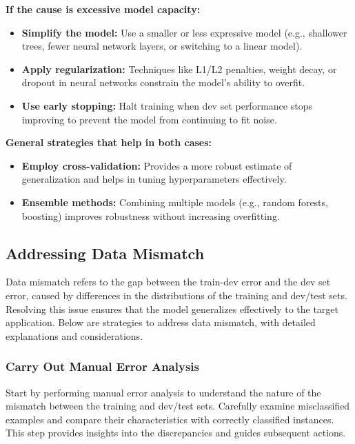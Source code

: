 \documentclass[12pt,openany, draft]{book}
\begin{document}
\textbf{If the cause is excessive model capacity:}
\begin{itemize}
    \item \textbf{Simplify the model:} Use a smaller or less expressive model (e.g., shallower trees, fewer neural network layers, or switching to a linear model).
    \item \textbf{Apply regularization:} Techniques like L1/L2 penalties, weight decay, or dropout in neural networks constrain the model's ability to overfit.
    \item \textbf{Use early stopping:} Halt training when dev set performance stops improving to prevent the model from continuing to fit noise.
\end{itemize}

\textbf{General strategies that help in both cases:}
\begin{itemize}
    \item \textbf{Employ cross-validation:} Provides a more robust estimate of generalization and helps in tuning hyperparameters effectively.
    \item \textbf{Ensemble methods:} Combining multiple models (e.g., random forests, boosting) improves robustness without increasing overfitting.
\end{itemize}


\subsection{Addressing Data Mismatch}
\label{subsec:Adressing Data Mismatch}

Data mismatch refers to the gap between the train-dev error and the dev set error, caused by differences in the distributions of the training and dev/test sets. Resolving this issue ensures that the model generalizes effectively to the target application. Below are strategies to address data mismatch, with detailed explanations and considerations.

\subsubsection{Carry Out Manual Error Analysis}

Start by performing manual error analysis to understand the nature of the mismatch between the training and dev/test sets. Carefully examine misclassified examples and compare their characteristics with correctly classified instances. This step provides insights into the discrepancies and guides subsequent actions.
\end{document}

